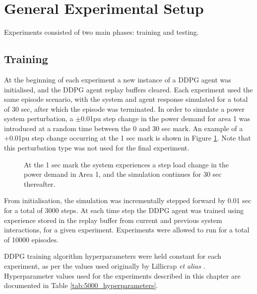 \section{General Experimental Setup}

Experiments consisted of two main phases: training and testing.

\subsection{Training}\label{ssec:training}
At the beginning of each experiment a new instance of a DDPG agent was initialised, and the DDPG agent replay buffers cleared. Each experiment used the same episode scenario, with the system and agent response simulated for a total of 30 sec, after which the episode was terminated. In order to simulate a power system perturbation, a $\pm$0.01pu step change in the power demand for area 1 was introduced at a random time between the 0 and 30 sec mark. An example of a +0.01pu step change occurring at the 1 sec mark is shown in Figure \ref{fig:5001_demand_profile}. Note that this perturbation type was not used for the final experiment.

\begin{figure}[h]
	\centering
	
	\caption[Preliminary investigation load demand step change]{At the 1 sec mark the system experiences a step load change in the power demand in Area 1, and the simulation continues for 30 sec thereafter.}
	\label{fig:5001_demand_profile}
\end{figure}

From initialisation, the simulation was incrementally stepped forward by 0.01 sec for a total of 3000 steps. At each time step the DDPG agent was trained using experience stored in the replay buffer from current and previous system interactions, for a given experiment. Experiments were allowed to run for a total of 10000 episodes.

DDPG training algorithm hyperparameters were held constant for each experiment, as per the values used originally by Lillicrap \textit{et alias} \cite{Lillicrap2015}. Hyperparameter values used for the experiments described in this chapter are documented in Table \ref{tab:5000_hyperparameters}.

